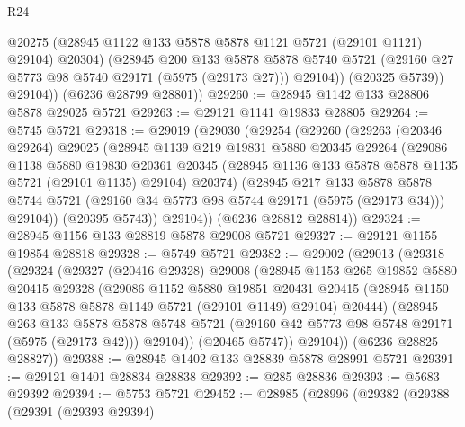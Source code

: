 \begin{lexlean}{R24}
\begin{coremodule}
                @20275
                (@28945 @1122 @133 @5878 @5878 @1121 @5721 (@29101 @1121) @29104)
                @20304)
              (@28945
                @200
                @133
                @5878
                @5878
                @5740
                @5721
                (@29160 @27 @5773 @98 @5740 @29171 (@5975 (@29173 @27)))
                @29104))
            (@20325 @5739))
          @29104))
      (@6236 @28799 @28801))
@29260 := @28945 @1142 @133 @28806 @5878 @29025 @5721
@29263 := @29121 @1141 @19833 @28805
@29264 := @5745 @5721
@29318 := @29019
    (@29030
      (@29254
        (@29260
          (@29263
            (@20346 @29264)
            @29025
            (@28945
              @1139
              @219
              @19831
              @5880
              @20345
              @29264
              (@29086
                @1138
                @5880
                @19830
                @20361
                @20345
                (@28945 @1136 @133 @5878 @5878 @1135 @5721 (@29101 @1135) @29104)
                @20374)
              (@28945
                @217
                @133
                @5878
                @5878
                @5744
                @5721
                (@29160 @34 @5773 @98 @5744 @29171 (@5975 (@29173 @34)))
                @29104))
            (@20395 @5743))
          @29104))
      (@6236 @28812 @28814))
@29324 := @28945 @1156 @133 @28819 @5878 @29008 @5721
@29327 := @29121 @1155 @19854 @28818
@29328 := @5749 @5721
@29382 := @29002
    (@29013
      (@29318
        (@29324
          (@29327
            (@20416 @29328)
            @29008
            (@28945
              @1153
              @265
              @19852
              @5880
              @20415
              @29328
              (@29086
                @1152
                @5880
                @19851
                @20431
                @20415
                (@28945 @1150 @133 @5878 @5878 @1149 @5721 (@29101 @1149) @29104)
                @20444)
              (@28945
                @263
                @133
                @5878
                @5878
                @5748
                @5721
                (@29160 @42 @5773 @98 @5748 @29171 (@5975 (@29173 @42)))
                @29104))
            (@20465 @5747))
          @29104))
      (@6236 @28825 @28827))
@29388 := @28945 @1402 @133 @28839 @5878 @28991 @5721
@29391 := @29121 @1401 @28834 @28838
@29392 := @285 @28836
@29393 := @5683 @29392
@29394 := @5753 @5721
@29452 := @28985
    (@28996
      (@29382
        (@29388
          (@29391
            (@29393 @29394)

\end{coremodule}
\end{lexlean}
